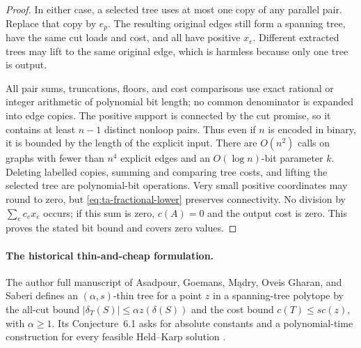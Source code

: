 \begin{proof}
In either case, a selected tree uses at most one copy of any parallel
pair. Replace that copy by $e_p$. The resulting original edges still
form a spanning tree, have the same cut loads and cost, and all have
positive $x_e$. Different extracted trees may lift to the same original
edge, which is harmless because only one tree is output.

All pair sums, truncations, floors, and cost comparisons use exact
rational or integer arithmetic of polynomial bit length; no common
denominator is expanded into edge copies. The positive support is
connected by the cut promise, so it contains at least $n-1$ distinct
nonloop pairs. Thus even if $n$ is encoded in binary, it is bounded by
the length of the explicit input. There are $O(n^2)$ calls on graphs
with fewer than $n^4$ explicit edges and an $O(\log n)$-bit parameter
$k$. Deleting labelled copies, summing and comparing tree costs, and
lifting the selected tree are polynomial-bit operations. Very small
positive coordinates may round to zero, but
\eqref{eq:ta-fractional-lower} preserves connectivity. No division by
$\sum_e c_ex_e$ occurs; if this sum is zero, $c(A)=0$ and the output
cost is zero. This proves the stated bit bound and covers zero values.
\end{proof}

\paragraph{The historical thin-and-cheap formulation.}
The author full manuscript of Asadpour, Goemans, M\k{a}dry, Oveis
Gharan, and Saberi defines an $(\alpha,s)$-thin tree for a point $z$
in a spanning-tree polytope by the all-cut bound
$|\delta_T(S)|\le\alpha z(\delta(S))$ and the cost bound
$c(T)\le s c(z)$, with $\alpha\ge1$. Its Conjecture~6.1 asks for
absolute constants and a polynomial-time construction for every
feasible Held--Karp solution
\cite[author full manuscript, Definition~4.1 and Conjecture~6.1]{AsadpourEtAl2017}.

